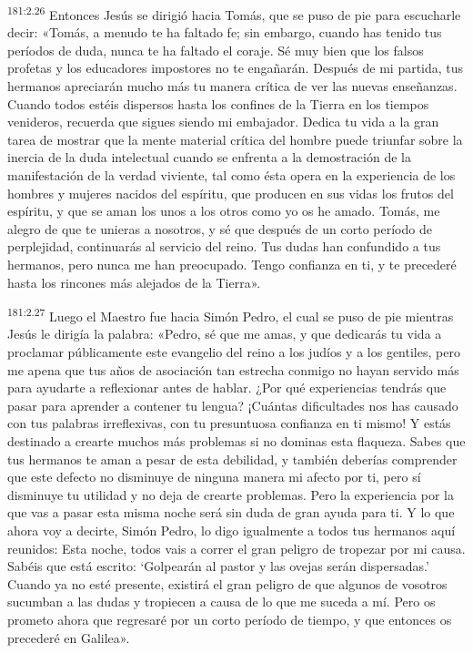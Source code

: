 \par 
\textsuperscript{181:2.26} Entonces Jesús se dirigió hacia Tomás, que se puso de pie para escucharle decir: «Tomás, a menudo te ha faltado fe; sin embargo, cuando has tenido tus períodos de duda, nunca te ha faltado el coraje. Sé muy bien que los falsos profetas y los educadores impostores no te engañarán. Después de mi partida, tus hermanos apreciarán mucho más tu manera crítica de ver las nuevas enseñanzas. Cuando todos estéis dispersos hasta los confines de la Tierra en los tiempos venideros, recuerda que sigues siendo mi embajador. Dedica tu vida a la gran tarea de mostrar que la mente material crítica del hombre puede triunfar sobre la inercia de la duda intelectual cuando se enfrenta a la demostración de la manifestación de la verdad viviente, tal como ésta opera en la experiencia de los hombres y mujeres nacidos del espíritu, que producen en sus vidas los frutos del espíritu, y que se aman los unos a los otros como yo os he amado. Tomás, me alegro de que te unieras a nosotros, y sé que después de un corto período de perplejidad, continuarás al servicio del reino. Tus dudas han confundido a tus hermanos, pero nunca me han preocupado. Tengo confianza en ti, y te precederé hasta los rincones más alejados de la Tierra».

\par 
\textsuperscript{181:2.27} Luego el Maestro fue hacia Simón Pedro, el cual se puso de pie mientras Jesús le dirigía la palabra: «Pedro, sé que me amas, y que dedicarás tu vida a proclamar públicamente este evangelio del reino a los judíos y a los gentiles, pero me apena que tus años de asociación tan estrecha conmigo no hayan servido más para ayudarte a reflexionar antes de hablar. ¿Por qué experiencias tendrás que pasar para aprender a contener tu lengua? ¡Cuántas dificultades nos has causado con tus palabras irreflexivas, con tu presuntuosa confianza en ti mismo! Y estás destinado a crearte muchos más problemas si no dominas esta flaqueza. Sabes que tus hermanos te aman a pesar de esta debilidad, y también deberías comprender que este defecto no disminuye de ninguna manera mi afecto por ti, pero sí disminuye tu utilidad y no deja de crearte problemas. Pero la experiencia por la que vas a pasar esta misma noche será sin duda de gran ayuda para ti. Y lo que ahora voy a decirte, Simón Pedro, lo digo igualmente a todos tus hermanos aquí reunidos: Esta noche, todos vais a correr el gran peligro de tropezar por mi causa. Sabéis que está escrito: `Golpearán al pastor y las ovejas serán dispersadas.' Cuando ya no esté presente, existirá el gran peligro de que algunos de vosotros sucumban a las dudas y tropiecen a causa de lo que me suceda a mí. Pero os prometo ahora que regresaré por un corto período de tiempo, y que entonces os precederé en Galilea».


